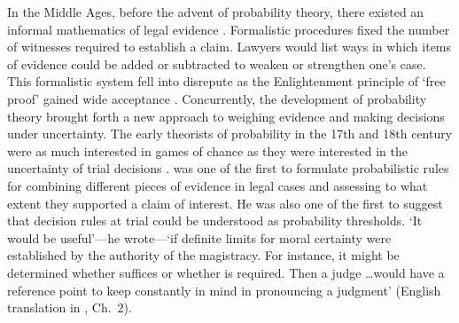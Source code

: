 \documentclass{article}
\begin{document}
In the Middle Ages, before the advent of probability theory, 
there existed an informal mathematics 
of legal evidence \citep{wigmore1901number}. Formalistic procedures fixed the number of witnesses required to establish a claim. Lawyers would list 
ways in which items of 
evidence could be added or subtracted to 
weaken or strengthen one's case. This formalistic system fell into disrepute as the Enlightenment principle of `free proof' gained wide acceptance \citep{damaska1996free}. 
 Concurrently, the development of probability theory brought forth a new approach to weighing evidence and making decisions under uncertainty. The early  theorists of probability in the 17th and 18th century were as much interested in games of chance as they were interested in the uncertainty of trial decisions  \citep{Hacking1984, daston1988, Franklin2001}. 
 \cite{Bernoulli1713Ars-conjectandi} 
 was  one 
of the first to formulate probabilistic rules for combining different pieces of evidence in legal cases and assessing to what extent they supported a claim of interest. 
 He was also one of the first to suggest that decision rules at trial could be understood 
as probability thresholds. 
`It would be useful'---he wrote---`if definite limits for moral certainty were established by the authority of the magistracy. For instance, it might be determined whether  suffices or whether  is required. Then a judge \dots would have a reference point to keep constantly in mind in pronouncing a judgment' (English translation in \cite{bernoulli-trans2006}, Ch.\ 2). 
%
\end{document}
